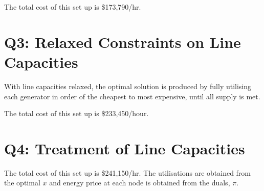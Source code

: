 \documentclass[11pt]{article}
\begin{document}
The total cost of this set up is \$173,790/hr.

\section*{Q3: Relaxed Constraints on Line Capacities}
With line capacities relaxed, the optimal solution is produced by fully utilising each generator in order of the cheapest to most expensive, until all supply is met. 

The total cost of this set up is \$233,450/hour.  

\section*{Q4: Treatment of Line Capacities}

The total cost of this set up is \$241,150/hr. The utilisations are obtained from the optimal $x$ and energy price at each node is obtained from the duals, $\pi$.
\end{document}
